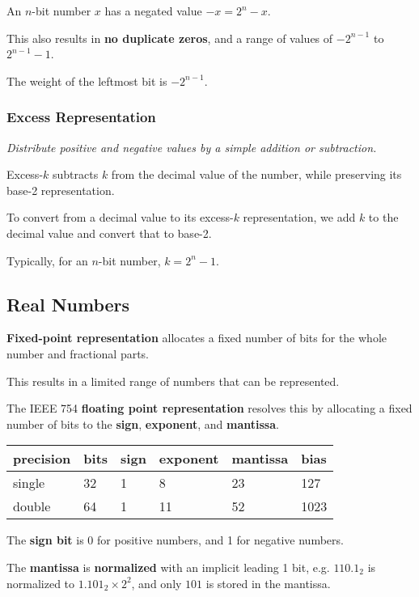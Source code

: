 An $n$-bit number $x$ has a negated value $-x = 2^n - x$.

This also results in \textbf{no duplicate zeros}, and a range of values of $-2^{n-1}$ to $2^{n-1}-1$.

The weight of the leftmost bit is $-2^{n-1}$.

\subsubsection{Excess Representation}
\emph{Distribute positive and negative values by a simple addition or subtraction.}

Excess-$k$ subtracts $k$ from the decimal value of the number, while preserving its base-2 representation.

To convert from a decimal value to its excess-$k$ representation, we add $k$ to the decimal value and convert that to base-2.

Typically, for an $n$-bit number, $k = 2^n - 1$.

\subsection{Real Numbers}

\textbf{Fixed-point representation} allocates a fixed number of bits for the whole number and fractional parts.

This results in a limited range of numbers that can be represented.

The IEEE 754 \textbf{floating point representation} resolves this by allocating a fixed number of bits to the
\textbf{sign}, \textbf{exponent}, and \textbf{mantissa}.

\begin{tabular}{l|l|l|l|l|l}
    precision & bits & sign & exponent & mantissa & bias \\\hline
    single & 32 & 1 & 8 & 23 & 127 \\
    double & 64 & 1 & 11 & 52 & 1023 \\
\end{tabular}

The \textbf{sign bit} is 0 for positive numbers, and 1 for negative numbers.

The \textbf{mantissa} is \textbf{normalized} with an implicit leading 1 bit, e.g. $110.1_2$ is normalized to
$1.101_2 \times 2^2$, and only $101$ is stored in the mantissa.